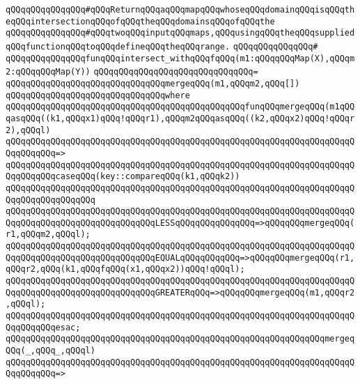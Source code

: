 \newline
\verb|qQQqqQQqqQQqqQQq#qQQqReturnqQQqaqQQqmapqQQqwhoseqQQqdomainqQQqisqQQqtheqQQqintersectionqQQqofqQQqtheqQQqdomainsqQQqofqQQqthe|\newline
\verb|qQQqqQQqqQQqqQQq#qQQqtwoqQQqinputqQQqmaps,qQQqusingqQQqtheqQQqsuppliedqQQqfunctionqQQqtoqQQqdefineqQQqtheqQQqrange.|\newline
\verb|qQQqqQQqqQQqqQQq#|\newline
\verb|qQQqqQQqqQQqqQQqfunqQQqintersect_withqQQqfqQQq(m1:qQQqqQQqMap(X),qQQqm2:qQQqqQQqMap(Y))|\newline
\verb|qQQqqQQqqQQqqQQqqQQqqQQqqQQqqQQq=|\newline
\verb|qQQqqQQqqQQqqQQqqQQqqQQqqQQqqQQqmergeqQQq(m1,qQQqm2,qQQq[])|\newline
\verb|qQQqqQQqqQQqqQQqqQQqqQQqqQQqqQQqwhere|\newline
\verb|qQQqqQQqqQQqqQQqqQQqqQQqqQQqqQQqqQQqqQQqqQQqqQQqfunqQQqmergeqQQq(m1qQQqasqQQq((k1,qQQqx1)qQQq!qQQqr1),qQQqm2qQQqasqQQq((k2,qQQqx2)qQQq!qQQqr2),qQQql)|\newline
\verb|qQQqqQQqqQQqqQQqqQQqqQQqqQQqqQQqqQQqqQQqqQQqqQQqqQQqqQQqqQQqqQQqqQQqqQQqqQQqqQQq=>|\newline
\verb|qQQqqQQqqQQqqQQqqQQqqQQqqQQqqQQqqQQqqQQqqQQqqQQqqQQqqQQqqQQqqQQqqQQqqQQqqQQqqQQqcaseqQQq(key::compareqQQq(k1,qQQqk2))|\newline
\verb|qQQqqQQqqQQqqQQqqQQqqQQqqQQqqQQqqQQqqQQqqQQqqQQqqQQqqQQqqQQqqQQqqQQqqQQqqQQqqQQqqQQqqQQq|\newline
\verb|qQQqqQQqqQQqqQQqqQQqqQQqqQQqqQQqqQQqqQQqqQQqqQQqqQQqqQQqqQQqqQQqqQQqqQQqqQQqqQQqqQQqqQQqqQQqqQQqqQQqLESSqQQqqQQqqQQqqQQq=>qQQqqQQqmergeqQQq(r1,qQQqm2,qQQql);|\newline
\verb|qQQqqQQqqQQqqQQqqQQqqQQqqQQqqQQqqQQqqQQqqQQqqQQqqQQqqQQqqQQqqQQqqQQqqQQqqQQqqQQqqQQqqQQqqQQqqQQqqQQqEQUALqQQqqQQqqQQq=>qQQqqQQqmergeqQQq(r1,qQQqr2,qQQq(k1,qQQqfqQQq(x1,qQQqx2))qQQq!qQQql);|\newline
\verb|qQQqqQQqqQQqqQQqqQQqqQQqqQQqqQQqqQQqqQQqqQQqqQQqqQQqqQQqqQQqqQQqqQQqqQQqqQQqqQQqqQQqqQQqqQQqqQQqqQQqGREATERqQQq=>qQQqqQQqmergeqQQq(m1,qQQqr2,qQQql);|\newline
\verb|qQQqqQQqqQQqqQQqqQQqqQQqqQQqqQQqqQQqqQQqqQQqqQQqqQQqqQQqqQQqqQQqqQQqqQQqqQQqqQQqesac;|\newline
\newline
\verb|qQQqqQQqqQQqqQQqqQQqqQQqqQQqqQQqqQQqqQQqqQQqqQQqqQQqqQQqqQQqqQQqmergeqQQq(_,qQQq_,qQQql)|\newline
\verb|qQQqqQQqqQQqqQQqqQQqqQQqqQQqqQQqqQQqqQQqqQQqqQQqqQQqqQQqqQQqqQQqqQQqqQQqqQQqqQQq=>|\newline

